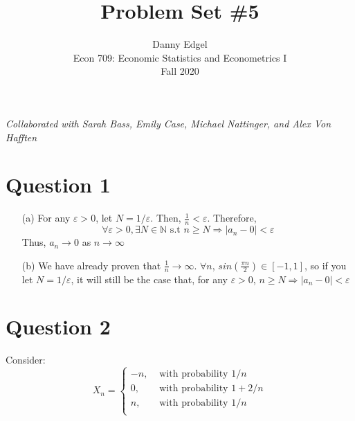 \documentclass{article}
\begin{document}
\title{	Problem Set \#5 }
\author{ 	Danny Edgel 										\\ 
			Econ 709: Economic Statistics and Econometrics I	\\
			Fall 2020											\\
		}
\maketitle\thispagestyle{empty}


\noindent\textit{Collaborated with Sarah Bass, Emily Case, Michael Nattinger, and Alex Von Hafften}

\section*{Question 1}
\begin{itemize}
	\item[(a)] For any $\varepsilon>0$, let $N=1/\varepsilon$. Then, $\frac{1}{n}<\varepsilon$. Therefore,
		\[
			\forall\varepsilon>0,\exists N\in\mathbb{N}\text{ s.t }n\geq N\Rightarrow|a_n-0|<\varepsilon
		\]
		Thus, $a_n\rightarrow0$ as $n\rightarrow\infty$
	\item[(b)] We have already proven that $\frac{1}{n}\rightarrow\infty$. $\forall n$, $sin(\frac{\pi n}{2})\in[-1,1]$, so if you let $N=1/\varepsilon$, it will still be the case that, for any $\varepsilon>0$, ${n\geq N\Rightarrow |a_n-0|<\varepsilon}$
\end{itemize}



\section*{Question 2}
Consider:
\[
	X_n = 	\begin{cases}
				-n, &\text{ with probability } 1/n		\\
				0,  &\text{ with probability } 1 + 2/n 	\\
				n,  &\text{ with probability } 1/n		\\
			\end{cases}
\]
\end{document}
